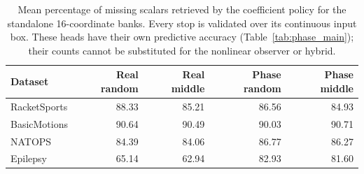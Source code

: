 \begin{table}[!htbp]
\centering\small
\begin{tabular}{lrrrr}
\toprule
Dataset & Real random & Real middle & Phase random & Phase middle \\
\midrule
RacketSports & 88.33 & 85.21 & 86.56 & 84.93 \\
BasicMotions & 90.64 & 90.49 & 90.03 & 90.71 \\
NATOPS & 84.39 & 84.06 & 86.77 & 86.27 \\
Epilepsy & 65.14 & 62.94 & 82.93 & 81.60 \\
\bottomrule
\end{tabular}
\caption{Mean percentage of missing scalars retrieved by the coefficient policy for the standalone 16-coordinate banks. Every stop is validated over its continuous input box. These heads have their own predictive accuracy (Table~\ref{tab:phase_main}); their counts cannot be substituted for the nonlinear observer or hybrid.}
\label{tab:phase_retrieval}
\end{table}

